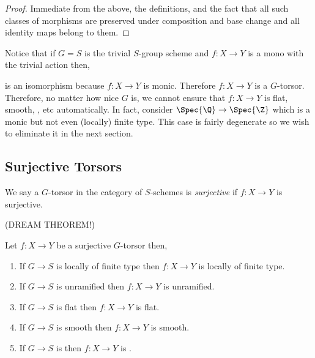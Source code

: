 \documentclass[12pt]{article}
\begin{document}
\begin{proof}
Immediate from the above, the definitions, and the fact that all such classes of morphisms are preserved under composition and base change and all identity maps belong to them.
\end{proof}

\begin{rmk}
Notice that if $G = S$ is the trivial $S$-group scheme and $f : X \to Y$ is a mono with the trivial action then,
\begin{center}
\end{center} 
is an isomorphism because $f : X \to Y$ is monic. Therefore $f : X \to Y$ is a $G$-torsor. Therefore, no matter how nice $G$ is, we cannot ensure that $f : X \to Y$ is flat, smooth, \etale, etc automatically. In fact, consider $\Spec{\Q} \to \Spec{\Z}$ which is a monic but not even (locally) finite type. This case is fairly degenerate so we wish to eliminate it in the next section.
\end{rmk}

\subsection{Surjective Torsors}

\begin{defn}
We say a $G$-torsor in the category of $S$-schemes is \textit{surjective} if $f : X \to Y$ is surjective.
\end{defn}

(DREAM THEOREM!)

\begin{prop}
Let $f : X \to Y$ be a surjective $G$-torsor then,
\begin{enumerate}
\item If $G \to S$ is locally of finite type then $f : X \to Y$ is locally of finite type.
\item If $G \to S$ is unramified then $f : X \to Y$ is unramified.
\item If $G \to S$ is flat then $f : X \to Y$ is flat.
\item If $G \to S$ is smooth then $f : X \to Y$ is smooth.
\item If $G \to S$ is \etale then $f : X \to Y$ is \etale.
\end{enumerate}
\end{prop}
\end{document}
